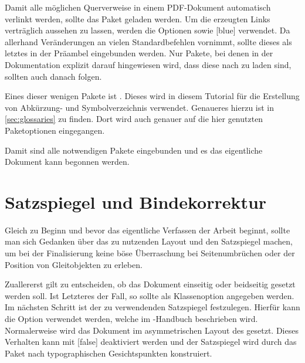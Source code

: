 \documentclass[%
  english,ngerman,%
  geometry=no,DIV=12,automark,%
]{tudscrartcl}
\begin{document}
Damit alle möglichen Querverweise in einem PDF-Dokument automatisch verlinkt 
werden, sollte das Paket  geladen werden. Um die erzeugten 
Links verträglich aussehen zu lassen, werden die Optionen  
sowie [blue] verwendet. Da  allerhand 
Veränderungen an vielen Standardbefehlen vornimmt, sollte dieses als letztes in 
der Präambel eingebunden werden. Nur Pakete, bei denen in der Dokumentation 
explizit darauf hingewiesen wird, dass diese nach  zu laden 
sind, sollten auch danach folgen.
%
\begin{Excerpt*}
\usepackage[colorlinks,linkcolor=blue]{hyperref}
\end{Excerpt*}
%
Eines dieser wenigen Pakete ist . Dieses wird in diesem 
Tutorial für die Erstellung von Abkürzung- und Symbolverzeichnis verwendet. 
Genaueres hierzu ist in \autoref{sec:glossaries} zu finden. Dort wird auch 
genauer auf die hier genutzten Paketoptionen eingegangen.
%
\begin{Excerpt*}
\usepackage[%
  automake,%
  acronym,%
  symbols,%
  nomain,%
  translate=babel,%
  nogroupskip,%
  toc,%
  section=section,%
]{glossaries}
\makeglossaries
\end{Excerpt*}
%
Damit sind alle notwendigen Pakete eingebunden und es das eigentliche Dokument 
kann begonnen werden.
\begin{Excerpt*}
\begin{document}
\end{Excerpt*}



\section{Satzspiegel und Bindekorrektur}
Gleich zu Beginn und bevor das eigentliche Verfassen der Arbeit beginnt, sollte 
man sich Gedanken über das zu nutzenden Layout und den Satzspiegel machen, um 
bei der Finalisierung keine böse Überraschung bei Seitenumbrüchen oder der 
Position von Gleitobjekten zu erleben.

Zuallererst gilt zu entscheiden, ob das Dokument einseitig oder beidseitig 
gesetzt werden soll. Ist Letzteres der Fall, so sollte  als 
Klassenoption angegeben werden. Im nächsten Schritt ist der zu verwendenden 
Satzspiegel festzulegen. Hierfür kann die Option  verwendet 
werden, welche im \TUDScript-Handbuch beschrieben wird. Normalerweise wird das 
Dokument im asymmetrischen Layout des \CDs gesetzt. Dieses Verhalten kann mit 
[false] deaktiviert werden und der Satzspiegel wird durch das 
Paket  nach typographischen Gesichtspunkten konstruiert.
\end{document}
